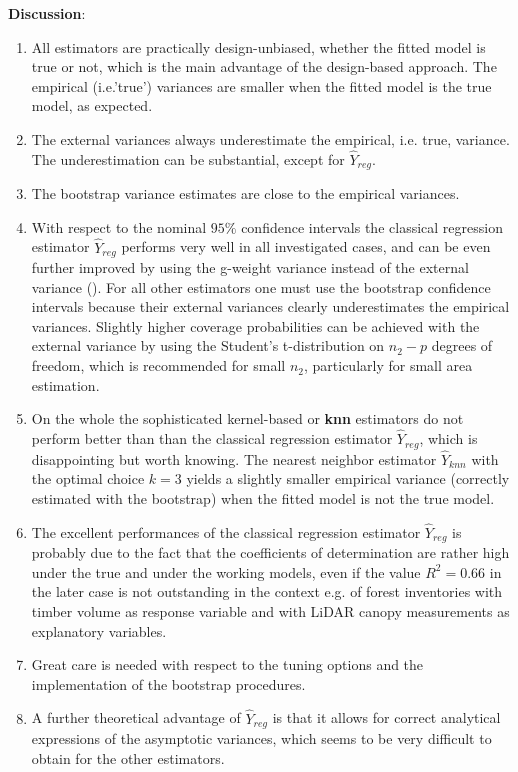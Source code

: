 \documentclass[a4paper,12pt,leqno, titlepage]{article}
\begin{document}
\noindent\textbf{Discussion}:
\begin{enumerate}
\item All estimators are practically design-unbiased, whether the fitted model is true or not, which is the main advantage of the design-based approach. The empirical (i.e.'true') variances are smaller when the fitted model is the true model, as expected.
\item
 The external variances always underestimate the empirical, i.e. true, variance. The underestimation can be substantial, except for $\hat{Y}_{reg}$.
 \item
The bootstrap variance estimates are close to the empirical variances.
\item
With respect to the nominal $95\%$ confidence intervals the classical regression estimator $\hat{Y}_{reg}$ performs very well in all investigated cases, and can be even further improved by using the g-weight variance instead of the external variance (\cite{mandallaz3}). For all other estimators one must use the bootstrap confidence intervals  because their external variances clearly underestimates the empirical variances. Slightly higher coverage probabilities can be achieved with the external variance by using the Student's t-distribution on $n_2-p$ degrees of freedom, which is recommended for small $n_2$, particularly for small area estimation.
\item
On the whole the sophisticated kernel-based or \textbf{knn} estimators do not perform better than than the classical regression estimator $\hat{Y}_{reg}$, which is disappointing but worth knowing. The nearest neighbor estimator $\hat{Y}_{knn}$ with the optimal choice $k=3$ yields a slightly smaller empirical variance (correctly estimated with the bootstrap) when the fitted model is not the true model.
\item
The excellent performances of the classical regression estimator $\hat{Y}_{reg}$ is probably due to the fact that the coefficients of determination are rather high under the true and under the working models, even if the value $R^2=0.66$ in the later case is not outstanding in the context e.g. of forest inventories with timber volume as response variable and with LiDAR canopy measurements as explanatory variables.
\item
Great care is needed with respect to the tuning options and the implementation of the bootstrap procedures.
\item
A further theoretical advantage of $\hat{Y}_{reg}$ is that it allows for correct analytical expressions of the asymptotic variances, which seems to be very difficult to obtain for the other estimators.

\end{enumerate}
\end{document}

